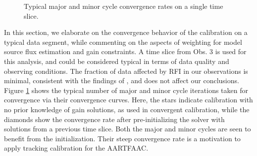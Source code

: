 \documentclass{aa}
\begin{document}
\begin{figure}[tbh]

\caption{\label{fig:Convergence-behaviour-of}Typical   major  and   minor  cycle
  convergence rates on  a single time slice.}
\end{figure}

In this section, we elaborate on the convergence behavior of the calibration on
a typical data  segment, while commenting on the aspects  of weighting for model
source flux estimation  and gain constraints.  A time slice from  Obs.  3 is used
for this analysis, and could be  considered typical in terms of data quality and
observing conditions.  The fraction of  data affected by RFI in our observations
is minimal, consistent with  the findings of \citep{offringa2013lofar}, and does
not affect our conclusions.  Figure \ref{fig:Convergence-behaviour-of} shows the
typical number  of major  and minor cycle  iterations taken for  convergence via
their convergence  curves. Here,  the stars indicate  calibration with  no prior
knowledge  of gain  solutions,  as  used in  convergent  calibration, while  the
diamonds  show  the convergence  rate  after  pre-initializing  the solver  with
solutions from a  previous time slice.  Both the major and  minor cycles are seen
to  benefit  from  the  initialization.  Their  steep  convergence  rate  is  a
motivation to apply tracking calibration for the AARTFAAC.
\end{document}
